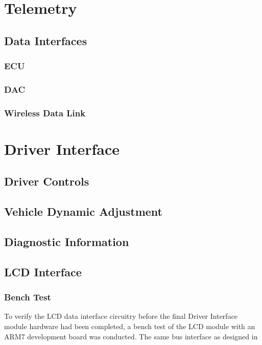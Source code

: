 \section{Telemetry}


\subsection{Data Interfaces}


\subsubsection{ECU }


\subsubsection{DAC }


\subsubsection{Wireless Data Link}


\section{Driver Interface}


\subsection{Driver Controls}


\subsection{Vehicle Dynamic Adjustment}


\subsection{Diagnostic Information}


\subsection{LCD Interface}

\subsubsection{Bench Test}

To verify the LCD data interface circuitry before the final Driver Interface module hardware had been completed, a bench test of the LCD module with an ARM7 development board was conducted. The same bus interface as designed in 

